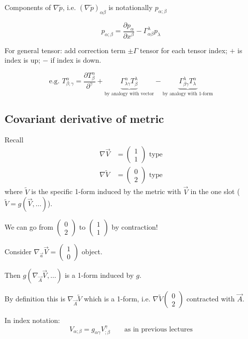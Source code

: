 \documentclass[a4paper]{article} %
\newcommand{\pmx}[1]{
\begin{pmatrix}
#1
\end{pmatrix}
}
\renewcommand{\tilde}{\widetilde}
\begin{document}
Components of $\nabla\tilde{p}$, i.e. $(\nabla\tilde{p})_{\alpha\beta}$ is notationally $p_{\alpha;\beta}$

\begin{equation}
p_{\alpha;\beta}=\frac{\partial p_{\alpha}}{\partial x^{\beta}}-\Gamma^{\lambda}_{\alpha\beta} p_{\lambda}
\end{equation}

For general tensor: add correction term $\pm \Gamma$ tensor for each tensor index; $+$ is index is up; $-$ if index is down.

\begin{equation}
\text{e.g. } T^{\alpha}_{\beta;\gamma}=\frac{\partial T^{\alpha}_{\beta}}{\partial^{\gamma}}
+\underbrace{\Gamma^{\alpha}_{\lambda\gamma} T^{\lambda}_{\beta}}_{\text{by analogy with vector}}
-\underbrace{\Gamma^{\lambda}_{\beta \gamma}T^{\alpha}_{\lambda}}_{\text{by analogy with 1-form}}
\end{equation}

\subsection{Covariant derivative of metric}

Recall
\begin{align}
\nabla \vec{V}&=\pmx{1\\1}\text{ type}\\
\nabla \tilde{V}&=\pmx{0\\2}\text{ type}
\end{align}
where $\tilde{V}$ is the specific 1-form induced by the metric with $\vec{V}$ in the one slot ($\tilde{V}=g(\vec{V},\ldots)$).

We can go from $\pmx{0\\2}$ to $\pmx{1\\1}$ by contraction! 

Consider $\nabla_{\vec{a}}\vec{V}=\pmx{1\\0}$ object. 

Then $g(\nabla_{\vec{A}}\vec{V},\ldots)$ is a 1-form induced by $g$. 

By definition this is $\nabla_{\vec{A}}\tilde{V}$ which is a 1-form, i.e. $\nabla\tilde{V}\pmx{0\\2}$ contracted with $\vec{A}$. 

In index notation:
\begin{equation}
V_{\alpha;\beta}=g_{\alpha\gamma}V^{\gamma}_{;\beta}\qquad\text{as in previous lectures}
\end{equation}
\end{document}
